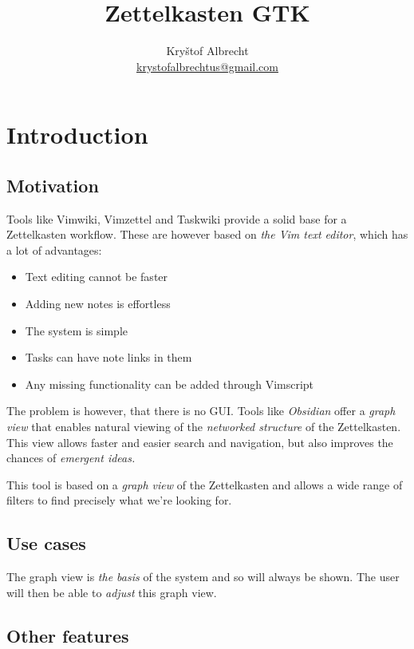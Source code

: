 \documentclass{article}
\title{Zettelkasten GTK}
\author{Kryštof Albrecht \\ \href{mailto:krystofalbrechtus@gmail.com}{krystofalbrechtus@gmail.com}}
\begin{document}
\maketitle
\tableofcontents

\newpage

\section{Introduction}

\subsection{Motivation}

Tools like Vimwiki, Vimzettel and Taskwiki provide a solid base for a Zettelkasten workflow. These are however based on \emph{the Vim text editor}, which has a lot of advantages:

\begin{itemize}
	\item Text editing cannot be faster
	
	\item Adding new notes is effortless

	\item The system is simple

	\item Tasks can have note links in them

	\item Any missing functionality can be added through Vimscript
\end{itemize}

The problem is however, that there is no GUI. Tools like \emph{Obsidian} offer a \emph{graph view} that enables natural viewing of the \emph{networked structure} of the Zettelkasten. This view allows faster and easier search and navigation, but also improves the chances of \emph{emergent ideas.}

This tool is based on a \emph{graph view} of the Zettelkasten and allows a wide range of filters to find precisely what we're looking for.

\subsection{Use cases}

The graph view is \emph{the basis} of the system and so will always be shown. The user will then be able to \emph{adjust} this graph view.

\begin{center}
\end{center}

\subsection{Other features}
\end{document}
